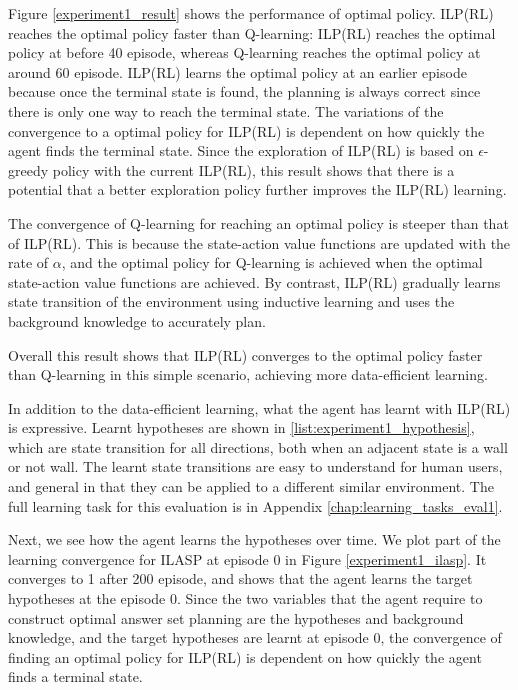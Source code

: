 Figure \ref{experiment1_result} shows the performance of optimal policy.
ILP(RL) reaches the optimal policy faster than Q-learning: ILP(RL) reaches the optimal policy at before 40 episode, 
whereas Q-learning reaches the optimal policy at around 60 episode. ILP(RL) learns the optimal policy at an earlier episode because once the terminal state is found, the planning is always correct since there is only one way to reach the terminal state. The variations of the convergence to a optimal policy for ILP(RL) is dependent on how quickly the agent finds the terminal state. 
Since the exploration of ILP(RL) is based on $\epsilon$-greedy policy with the current ILP(RL), this result shows that there is a potential that a better exploration policy further improves the ILP(RL) learning.

The convergence of Q-learning for reaching an optimal policy is steeper than that of ILP(RL). This is because the state-action value functions are updated with the rate of $\alpha$, and the optimal policy for Q-learning is achieved when the optimal state-action value functions are achieved. By contrast, 
ILP(RL) gradually learns state transition of the environment using inductive learning and uses the background knowledge to accurately plan. 

Overall this result shows that ILP(RL) converges to the optimal policy faster than Q-learning in this simple scenario, achieving more data-efficient learning.



In addition to the data-efficient learning, what the agent has learnt with ILP(RL) is expressive.
Learnt hypotheses are shown in \ref{list:experiment1_hypothesis}, which are state transition for all directions, both when an adjacent state is a wall or not wall. The learnt state transitions are easy to understand for human users, and general in that they can be applied to a different similar environment.
The full learning task for this evaluation is in Appendix \ref{chap:learning_tasks_eval1}.

Next, we see how the agent learns the hypotheses over time. We plot part of the learning convergence for ILASP at episode 0 in Figure \ref{experiment1_ilasp}.
It converges to 1 after 200 episode, and shows that the agent learns the target hypotheses at the episode 0.
Since the two variables that the agent require to construct optimal answer set planning are the hypotheses and background knowledge, and the target hypotheses are learnt at episode 0, the convergence of finding an optimal policy for ILP(RL) is dependent on how quickly the agent finds a terminal state. 

